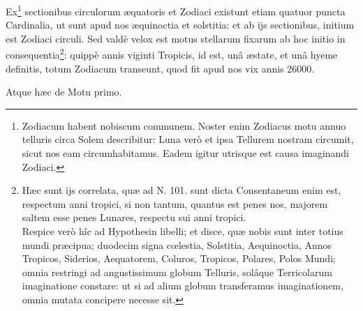 \documentclass[a4paper, 11pt, oneside, polutonikogreek, german]{article}
\begin{document}
Ex\footnote{Zodiacum habent nobiscum communem. Noster enim Zodiacus motu annuo telluris circa Solem describitur: Luna verò et ipsa Tellurem nostram circumit, sicut nos eam circumhabitamus. Eadem igitur utrisque est causa imaginandi Zodiaci.} sectionibus circulorum æquatoris et Zodiaci existunt etiam quatuor puncta Cardinalia, ut sunt apud nos æquinoctia et solstitia: et ab ijs sectionibus, initium est Zodiaci circuli. Sed valdè velox est motus stellarum fixarum ab hoc initio in consequentia\footnote{Hæc sunt ijs correlata, quæ ad N. 101. sunt dicta Consentaneum enim est, respectum anni tropici, si non tantum, quantus est penes nos, majorem saltem esse penes Lunares, respectu sui anni tropici.\\\hspace*{5mm}Respice verò hîc ad Hypothesin libelli; et disce, quæ nobis sunt inter totius mundi præcipua; duodecim signa cœlestia, Solstitia, Aequinoctia, Annos Tropicos, Siderios, Aequatorem, Coluros, Tropicos, Polares, Polos Mundi; omnia restringi ad angustissimum globum Telluris, solâque Terricolarum imaginatione constare: ut si ad alium globum transferamus imaginationem, omnia mutata concipere necesse sit.}: quippè annis viginti Tropicis, id est, unâ æstate, et unâ hyeme definitis, totum Zodiacum transeunt, quod fit apud nos vix annis 26000.

Atque hæc de Motu primo.
\end{document}
